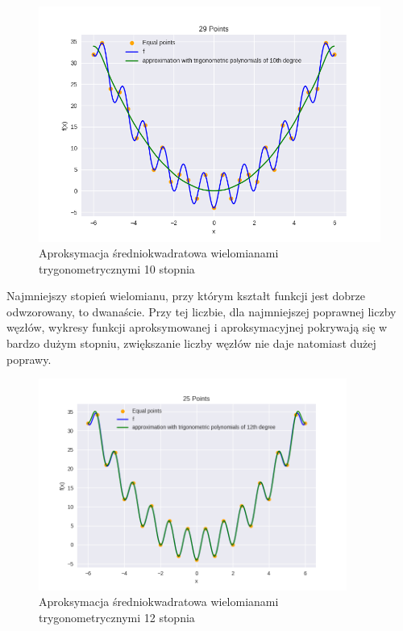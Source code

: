 \documentclass{article}
\begin{document}
\begin{figure}[H]
    \centering
    \includegraphics[width=\textwidth]{img/tripoly_10_29.png}
    \caption{Aproksymacja średniokwadratowa wielomianami trygonometrycznymi 10 stopnia}
\end{figure}

Najmniejszy stopień wielomianu, przy którym kształt funkcji jest dobrze odwzorowany, to dwanaście. Przy tej liczbie, dla najmniejszej poprawnej liczby
węzłów, wykresy funkcji aproksymowanej i aproksymacyjnej pokrywają się w bardzo dużym stopniu, zwiększanie liczby węzłów nie daje natomiast
dużej poprawy.

\begin{figure}[H]
    \centering
    \includegraphics[width=0.9\textwidth]{img/tripoly_12_25.png}
    \caption{Aproksymacja średniokwadratowa wielomianami trygonometrycznymi 12 stopnia}
\end{figure}
\end{document}

